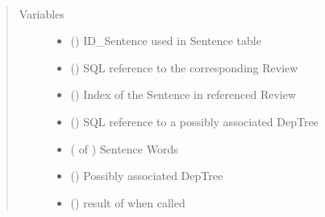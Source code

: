 \documentclass[letterpaper,10pt,english]{sphinxmanual}
\begin{document}
\begin{fulllineitems}
\label{\detokenize{classes:loacore.classes.classes.Sentence}}~\begin{quote}\begin{description}
\item[{Variables}] \leavevmode\begin{itemize}
\item {} 
 () \textendash{} ID\_Sentence used in Sentence table

\item {} 
 () \textendash{} SQL reference to the corresponding Review

\item {} 
 () \textendash{} Index of the Sentence in referenced Review

\item {} 
 () \textendash{} SQL reference to a possibly associated DepTree

\item {} 
 ( of {\hyperref[\detokenize{classes:loacore.classes.classes.Word}]{}}) \textendash{} Sentence Words

\item {} 
 ({\hyperref[\detokenize{classes:loacore.classes.classes.DepTree}]{}}) \textendash{} Possibly associated DepTree

\item {} 
 () \textendash{} result of {\hyperref[\detokenize{classes:loacore.classes.classes.Sentence.compute_freeling_sentence}]{}} when called


\end{itemize}
\end{description}
\end{quote}
\end{fulllineitems}
\end{document}
